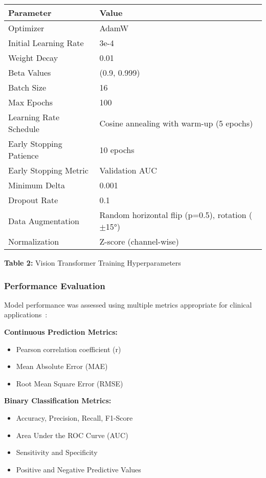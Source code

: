 \begin{center}
\small
\begin{tabular}{ll}
\hline
\textbf{Parameter} & \textbf{Value} \\
\hline
Optimizer & AdamW \\
Initial Learning Rate & 3e-4 \\
Weight Decay & 0.01 \\
Beta Values & (0.9, 0.999) \\
Batch Size & 16 \\
Max Epochs & 100 \\
Learning Rate Schedule & Cosine annealing with warm-up (5 epochs) \\
Early Stopping Patience & 10 epochs \\
Early Stopping Metric & Validation AUC \\
Minimum Delta & 0.001 \\
Dropout Rate & 0.1 \\
Data Augmentation & Random horizontal flip (p=0.5), rotation ($\pm$15°) \\
Normalization & Z-score (channel-wise) \\
\hline
\end{tabular}
\end{center}

\textbf{Table 2:} Vision Transformer Training Hyperparameters

\subsubsection{Performance Evaluation}

Model performance was assessed using multiple metrics appropriate for clinical applications~\cite{litjens2017survey}:

\textbf{Continuous Prediction Metrics:}
\begin{itemize}
\item Pearson correlation coefficient (r)
\item Mean Absolute Error (MAE) 
\item Root Mean Square Error (RMSE)
\end{itemize}

\textbf{Binary Classification Metrics:}
\begin{itemize}
\item Accuracy, Precision, Recall, F1-Score
\item Area Under the ROC Curve (AUC)
\item Sensitivity and Specificity
\item Positive and Negative Predictive Values
\end{itemize}

